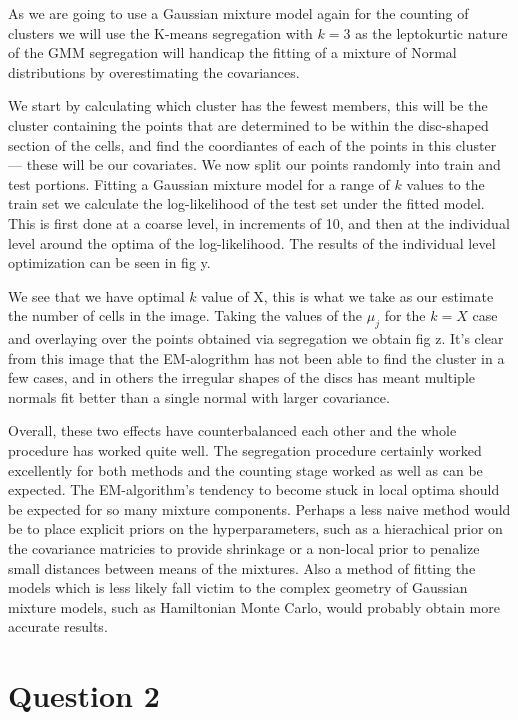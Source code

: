 \documentclass[a4paper]{article}
\begin{document}
As we are going to use a Gaussian mixture model again for the counting of clusters we will use the K-means segregation with $k = 3$ as the leptokurtic nature of the GMM segregation will handicap the fitting of a mixture of Normal distributions by overestimating the covariances.

We start by calculating which cluster has the fewest members, this will be the cluster containing the points that are determined to be within the disc-shaped section of the cells, and find the coordiantes of each of the points in this cluster --- these will be our covariates. We now split our points randomly into train and test portions. Fitting a Gaussian mixture model for a range of $k$ values to the train set we calculate the log-likelihood of the test set under the fitted model. This is first done at a coarse level, in increments of 10, and then at the individual level around the optima of the log-likelihood. The results of the individual level optimization can be seen in fig y.

We see that we have optimal $k$ value of X, this is what we take as our estimate the number of cells in the image. Taking the values of the $\mu_j$ for the $k = X$ case and overlaying over the points obtained via segregation we obtain fig z. It's clear from this image that the EM-alogrithm has not been able to find the cluster in a few cases, and in others the irregular shapes of the discs has meant multiple normals fit better than a single normal with larger covariance. 

Overall, these two effects have counterbalanced each other and the whole procedure has worked quite well. The segregation procedure certainly worked excellently for both methods and the counting stage worked as well as can be expected. The EM-algorithm's tendency to become stuck in local optima should be expected for so many mixture components. Perhaps a less naive method would be to place explicit priors on the hyperparameters, such as a hierachical prior on the covariance matricies to provide shrinkage or a non-local prior to penalize small distances between means of the mixtures. Also a method of fitting the models which is less likely fall victim to the complex geometry of Gaussian mixture models, such as Hamiltonian Monte Carlo, would probably obtain more accurate results.

\section*{Question 2}
\end{document}
